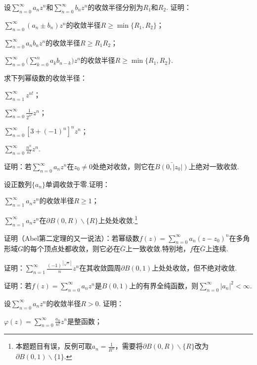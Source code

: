 \begin{xiti}
  \item 设$\sum_{n=0}^\infty a_nz^n$和$\sum_{n=0}^\infty b_nz^n$的收敛半径分别为$R_1$和$R_2$. 证明：
    \begin{enuma}
      \item $\sum_{n=0}^\infty(a_n\pm b_n)z^n$的收敛半径$R\ge\min\{R_1,R_2\}$；
      \item $\sum_{n=0}^\infty a_nb_nz^n$的收敛半径$R\ge R_1R_2$；
      \item $\sum_{n=0}^\infty\bigg(\sum_{k=0}^na_kb_{n-k}\bigg)z^n$的收敛半径$R\ge\min\{R_1,R_2\}$.
    \end{enuma}
  \item 求下列幂级数的收敛半径：
    \begin{enuma}
      \item $\sum_{n=1}^\infty z^{n!}$；
      \item $\sum_{n=0}^\infty\frac1{2^{n^2}}z^n$；
      \item $\sum_{n=0}^\infty[3+(-1)^n]^nz^n$；
      \item $\sum_{n=0}^\infty\frac{n^n}{n!}z^n$.
    \end{enuma}
  \item 证明：若$\sum_{n=0}^\infty a_nz^n$在$z_0\ne0$处绝对收敛，则它在$\bar{B(0,|z_0|)}$上绝对一致收敛.
  \item 设正数列$\{a_n\}$单调收敛于零.证明：
    \begin{enuma}
      \item $\sum_{n=1}^\infty a_nz^n$的收敛半径$R\ge1$；
      \item $\sum_{n=1}^\infty a_nz^n$在$\partial B(0,R)\backslash\{R\}$上处处收敛.\footnote{本题题目有误，反例可取$a_n=\frac1{R^n}$，需要将$\partial B(0,R)\backslash\{R\}$改为$\partial B(0,1)\backslash\{1\}$.}
    \end{enuma}
  \item 证明（Abel第二定理的又一说法）：若幂级数$f(z)=\sum_{n=0}^\infty a_n(z-z_0)^n$在多角形域$G$的每个顶点处都收敛，则它必在$\bar G$上一致收敛.特别地，$f$在$\bar G$上连续.
  \item 证明：$\sum_{n=1}^\infty \frac{(-1)^{[\sqrt n]}}nz^n$在其收敛圆周$\partial B(0,1)$上处处收敛，但不绝对收敛.
  \item 证明：若$f(z)=\sum_{n=0}^\infty a_nz^n$是$B(0,1)$上的有界全纯函数，则$\sum_{n=0}^\infty|a_n|^2<\infty$.
  \item 设$\sum_{n=0}^\infty a_nz^n$的收敛半径$R>0$. 证明：
    \begin{enuma}
      \item $\varphi(z)=\sum_{n=0}^\infty\frac{a_n}{n!}z^n$是整函数；

\end{enuma}
\end{xiti}
